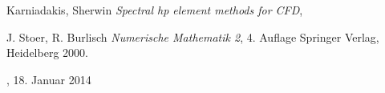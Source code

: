 \documentclass[a4paper]{scrartcl}
\theoremstyle{remark}  %
\begin{document}
\begin{thebibliography}{-----}

  Karniadakis, Sherwin
  {\em Spectral hp element methods for CFD},

  J. Stoer, R. Burlisch
  {\em Numerische Mathematik 2},
  4. Auflage
  Springer Verlag, Heidelberg 2000.

,
  18. Januar 2014

\end{thebibliography}
\end{document}
